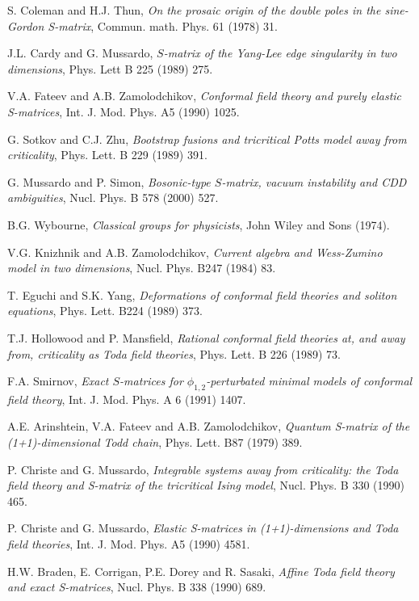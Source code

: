 \documentclass[a4paper,12pt]{report}
\begin{document}
\begin{thebibliography}{23}
 S. Coleman and H.J. Thun, {\it On the prosaic origin of the double poles in the sine-Gordon S-matrix},
Commun. math. Phys. 61 (1978) 31.

 J.L. Cardy and G. Mussardo, {\it $S$-matrix of the Yang-Lee edge singularity in two dimensions},
Phys. Lett B 225 (1989) 275.

 V.A. Fateev and A.B. Zamolodchikov, {\it Conformal field theory and purely elastic S-matrices},
Int. J. Mod. Phys. A5 (1990) 1025.

 G. Sotkov and C.J. Zhu, \textit{Bootstrap fusions and tricritical Potts model away from criticality},
Phys. Lett. B 229 (1989) 391.

 G. Mussardo and P. Simon, \textit{Bosonic-type $S$-matrix, vacuum instability and CDD ambiguities},
Nucl. Phys. B 578 (2000) 527.



 B.G. Wybourne, \textit{Classical groups for physicists}, John Wiley and Sons (1974).


 V.G. Knizhnik and A.B. Zamolodchikov, {\it Current algebra and Wess-Zumino model in two dimensions},
Nucl. Phys. B247 (1984) 83.

 T. Eguchi and S.K. Yang, {\it Deformations of conformal field theories and soliton equations},
Phys. Lett. B224 (1989) 373.

 T.J. Hollowood and P. Mansfield, {\it Rational conformal field theories at, and away from, criticality
as Toda field theories}, Phys. Lett. B 226 (1989) 73.

 F.A. Smirnov, {\it Exact $S$-matrices for $\phi_{1,2}$-perturbated minimal models of conformal field
theory}, Int. J. Mod. Phys. A 6 (1991) 1407.

 A.E. Arinshtein, V.A. Fateev and A.B. Zamolodchikov, {\it Quantum S-matrix of the (1+1)-dimensional
Todd chain}, Phys. Lett. B87 (1979) 389.

 P. Christe and G. Mussardo, \textit{Integrable systems away from criticality: the Toda field theory and
S-matrix of the tricritical Ising model}, Nucl. Phys. B 330 (1990) 465.

 P. Christe and G. Mussardo, \textit{Elastic S-matrices in (1+1)-dimensions and Toda field theories},
Int. J. Mod. Phys. A5 (1990) 4581.

 H.W. Braden, E. Corrigan, P.E. Dorey and R. Sasaki, \textit{Affine Toda field theory and exact S-matrices},
Nucl. Phys. B 338 (1990) 689.


\end{thebibliography}
\end{document}

